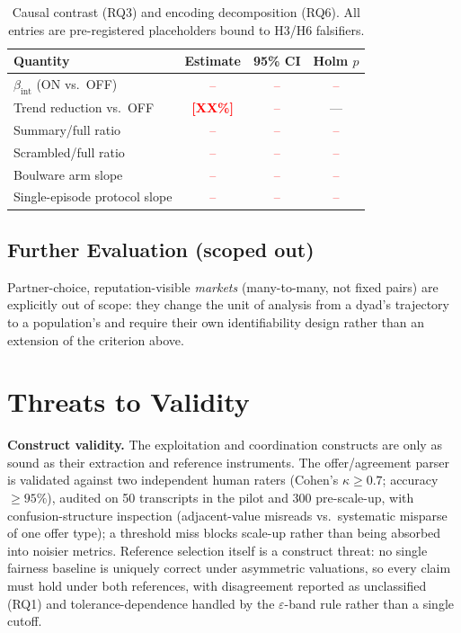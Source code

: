 \documentclass[conference]{IEEEtran}
\newcommand{\ph}[1]{\textcolor{red}{\textbf{[#1]}}}
\newcommand{\rescell}{\textcolor{red}{--}}
\newcommand{\eps}{\varepsilon}
\begin{document}
\begin{table}[t]
\caption{Causal contrast (RQ3) and encoding decomposition (RQ6). All entries
are pre-registered placeholders bound to H3/H6 falsifiers.}
\label{tab:contrast}
\centering
\begin{tabular}{lccc}
\toprule
Quantity & Estimate & 95\% CI & Holm $p$ \\
\midrule
$\beta_{\mathrm{int}}$ (ON vs.\ OFF) & \rescell & \rescell & \rescell \\
Trend reduction vs.\ OFF & \ph{XX\%} & \rescell & --- \\
Summary/full ratio & \rescell & \rescell & \rescell \\
Scrambled/full ratio & \rescell & \rescell & \rescell \\
Boulware arm slope & \rescell & \rescell & \rescell \\
Single-episode protocol slope & \rescell & \rescell & \rescell \\
\bottomrule
\end{tabular}
\end{table}

\subsection{Further Evaluation (scoped out)}
Partner-choice, reputation-visible \emph{markets} (many-to-many, not fixed
pairs) are explicitly out of scope: they change the unit of analysis from a
dyad's trajectory to a population's and require their own identifiability
design rather than an extension of the criterion above.

\section{Threats to Validity}\label{sec:threats}

\textbf{Construct validity.} The exploitation and coordination constructs are
only as sound as their extraction and reference instruments. The
offer/agreement parser is validated against two independent human raters
(Cohen's $\kappa \geq 0.7$; accuracy $\geq 95\%$), audited on 50 transcripts
in the pilot and 300 pre-scale-up, with confusion-structure inspection
(adjacent-value misreads vs.\ systematic misparse of one offer type); a
threshold miss blocks scale-up rather than being absorbed into noisier
metrics. Reference selection itself is a construct threat: no single fairness
baseline is uniquely correct under asymmetric valuations, so every claim must
hold under both references, with disagreement reported as unclassified (RQ1)
and tolerance-dependence handled by the $\eps$-band rule rather than a single
cutoff.
\end{document}
